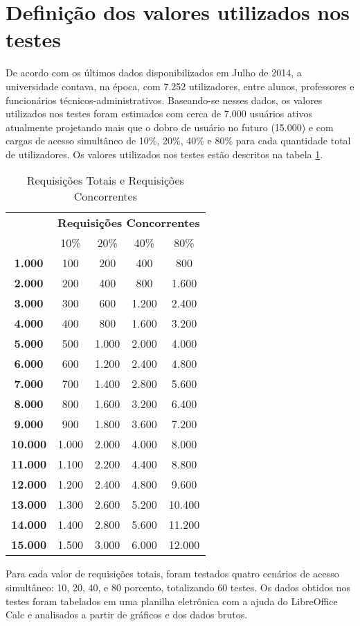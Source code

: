 \section{Definição dos valores utilizados nos testes}
De acordo com os últimos dados disponibilizados em Julho de 2014, a 
universidade contava, na época, com 7.252 utilizadores, entre alunos, 
professores e funcionários técnicos-administrativos. Baseando-se nesses dados, 
os valores utilizados nos testes foram estimados com cerca de 7.000 usuários 
ativos atualmente projetando mais que o dobro de usuário no futuro (15.000) e 
com cargas de acesso simultâneo de 10\%, 20\%, 40\% e 80\% para cada quantidade 
total de utilizadores. Os valores utilizados nos testes estão descritos na 
tabela \ref{tab:requisicoes}.
\begin{table}[htb]
	\centering
\ABNTEXfontereduzida
\caption[Requisições Totais e Requisições Concorrentes]{Requisições Totais e Requisições Concorrentes}
\label{tab:requisicoes}
\begin{tabular}{|>{\bfseries}c|c|c|c|c|}
\hline
\multirow{2}{*}{Requisições Totais} & \multicolumn{4}{c|}{\textbf{Requisições 
Concorrentes}} \\ \cline{2-5}
& 10\%      & 20\%  & 40\%  & 80\%  \\ \hline
1.000  & 100   & 200   & 400   & 800   \\ \hline
2.000  & 200   & 400   & 800   & 1.600  \\ \hline
3.000  & 300   & 600   & 1.200 & 2.400  \\ \hline
4.000  & 400   & 800   & 1.600 & 3.200  \\ \hline
5.000  & 500   & 1.000 & 2.000 & 4.000  \\ \hline
6.000  & 600   & 1.200 & 2.400 & 4.800  \\ \hline
7.000  & 700   & 1.400 & 2.800 & 5.600  \\ \hline
8.000  & 800   & 1.600 & 3.200 & 6.400  \\ \hline
9.000  & 900   & 1.800 & 3.600 & 7.200  \\ \hline
10.000 & 1.000 & 2.000 & 4.000 & 8.000  \\ \hline
11.000 & 1.100 & 2.200 & 4.400 & 8.800  \\ \hline
12.000 & 1.200 & 2.400 & 4.800 & 9.600  \\ \hline
13.000 & 1.300 & 2.600 & 5.200 & 10.400 \\ \hline
14.000 & 1.400 & 2.800 & 5.600 & 11.200 \\ \hline
15.000 & 1.500 & 3.000 & 6.000 & 12.000 \\ \hline
\end{tabular}
\end{table}
Para cada valor de requisições totais, foram testados quatro cenários de acesso 
simultâneo: 10, 20, 40, e 80 porcento, totalizando 60 testes. Os dados obtidos 
nos testes foram tabelados em uma planilha eletrônica com a ajuda do 
LibreOffice Calc e analisados a partir de gráficos e dos dados brutos.

